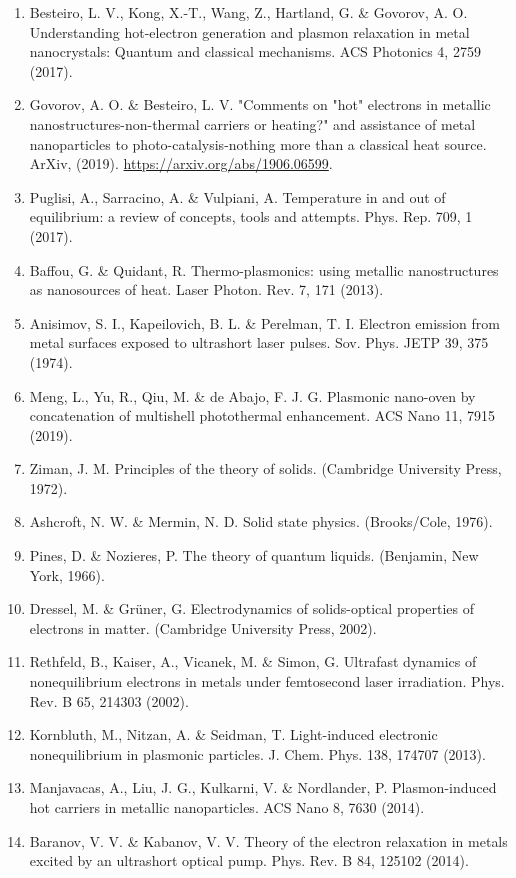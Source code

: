 \documentclass[10pt]{article}
\begin{document}
\begin{enumerate}
  \item Besteiro, L. V., Kong, X.-T., Wang, Z., Hartland, G. \& Govorov, A. O. Understanding hot-electron generation and plasmon relaxation in metal nanocrystals: Quantum and classical mechanisms. ACS Photonics 4, 2759 (2017).
  \item Govorov, A. O. \& Besteiro, L. V. "Comments on "hot" electrons in metallic nanostructures-non-thermal carriers or heating?" and assistance of metal nanoparticles to photo-catalysis-nothing more than a classical heat source. ArXiv, (2019). \href{https://arxiv.org/abs/1906.06599}{https://arxiv.org/abs/1906.06599}.
  \item Puglisi, A., Sarracino, A. \& Vulpiani, A. Temperature in and out of equilibrium: a review of concepts, tools and attempts. Phys. Rep. 709, 1 (2017).
  \item Baffou, G. \& Quidant, R. Thermo-plasmonics: using metallic nanostructures as nanosources of heat. Laser Photon. Rev. 7, 171 (2013).
  \item Anisimov, S. I., Kapeilovich, B. L. \& Perelman, T. I. Electron emission from metal surfaces exposed to ultrashort laser pulses. Sov. Phys. JETP 39, 375 (1974).
  \item Meng, L., Yu, R., Qiu, M. \& de Abajo, F. J. G. Plasmonic nano-oven by concatenation of multishell photothermal enhancement. ACS Nano 11, 7915 (2019).
  \item Ziman, J. M. Principles of the theory of solids. (Cambridge University Press, 1972).
  \item Ashcroft, N. W. \& Mermin, N. D. Solid state physics. (Brooks/Cole, 1976).
  \item Pines, D. \& Nozieres, P. The theory of quantum liquids. (Benjamin, New York, 1966).
  \item Dressel, M. \& Grüner, G. Electrodynamics of solids-optical properties of electrons in matter. (Cambridge University Press, 2002).
  \item Rethfeld, B., Kaiser, A., Vicanek, M. \& Simon, G. Ultrafast dynamics of nonequilibrium electrons in metals under femtosecond laser irradiation. Phys. Rev. B 65, 214303 (2002).
  \item Kornbluth, M., Nitzan, A. \& Seidman, T. Light-induced electronic nonequilibrium in plasmonic particles. J. Chem. Phys. 138, 174707 (2013).
  \item Manjavacas, A., Liu, J. G., Kulkarni, V. \& Nordlander, P. Plasmon-induced hot carriers in metallic nanoparticles. ACS Nano 8, 7630 (2014).
  \item Baranov, V. V. \& Kabanov, V. V. Theory of the electron relaxation in metals excited by an ultrashort optical pump. Phys. Rev. B 84, 125102 (2014).

\end{enumerate}
\end{document}
